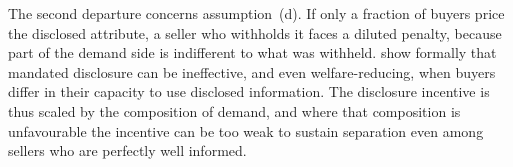 The second departure concerns assumption~(d). If only a fraction of buyers price the disclosed
attribute, a seller who withholds it faces a diluted penalty, because part of the demand side is
indifferent to what was withheld. \citet{fishman_mandatory_2003} show formally that mandated
disclosure can be ineffective, and even welfare-reducing, when buyers differ in their capacity to
use disclosed information. The disclosure incentive is thus scaled by the composition of demand,
and where that composition is unfavourable the incentive can be too weak to sustain separation
even among sellers who are perfectly well informed.
